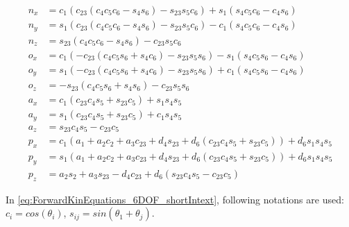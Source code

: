 
\begin{subequations}\label{eq:ForwardKinEquations_6DOF_shortIntext}
	\begin{align}
		n_x&=c_1(c_{23}(c_4c_5c_6-s_4s_6)-s_{23}s_5c_6)+s_1(s_4c_5c_6-c_4s_6)\\
		n_y&=s_1(c_{23}(c_4c_5c_6-s_4s_6)-s_{23}s_5c_6)-c_1(s_4c_5c_6-c_4s_6) \\
		n_z&=s_{23}(c_4c_5c_6-s_4s_6)-c_{23}s_5c_6 \\
		o_x&=c_1(-c_{23}(c_4c_5s_6+s_4c_6)-s_{23}s_5s_6)-s_1(s_4c_5s_6-c_4s_6) \\
		o_y&=s_1(-c_{23}(c_4c_5s_6+s_4c_6)-s_{23}s_5s_6)+c_1(s_4c_5s_6-c_4s_6) \\
		o_z&=-s_{23}(c_4c_5s_6+s_4s_6)-c_{23}s_5s_6 \\
		a_x&=c_1(c_{23}c_4s_5+s_{23}c_5)+s_1s_4s_5 \\
		a_y&=s_1(c_{23}c_4s_5+s_{23}c_5)+c_1s_4s_5 \\
		a_z&=s_{23}c_4s_5-c_{23}c_5 \\
		p_x&=c_1(a_1+a_2c_2+a_3c_{23}+d_4s_{23}+d_6(c_{23}c_4s_5+s_{23}c_5))+d_6s_1s_4s_5 \\
		p_y&=s_1(a_1+a_2c_2+a_3c_{23}+d_4s_{23}+d_6(c_{23}c_4s_5+s_{23}c_5))+d_6s_1s_4s_5 \\
		p_z&=a_2s_2+a_3s_{23}-d_4c_{23}+d_6(s_{23}c_4s_5-c_{23}c_5)
	\end{align}
\end{subequations}

In \ref{eq:ForwardKinEquations_6DOF_shortIntext}, following notations are used:
$c_i = cos(\theta_i)$, $s_{ij}=sin(\theta_1+\theta_j)$.